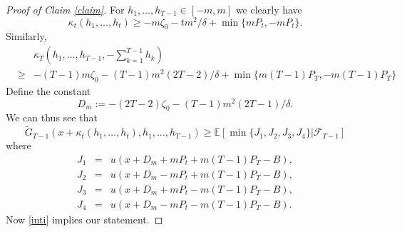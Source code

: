 \documentclass[a4paper]{article}
\begin{document}
\begin{proof}[Proof of Claim \ref{claim}]
For $h_{1},\ldots,h_{T-1}\in [-m,m]$ we clearly have
$$
\kappa_{t}(h_{1},\ldots,h_{t})\geq -m\zeta_{0}-tm^{2}/\delta+\min\{mP_{t},-mP_{t}\}.	
$$
Similarly,
\begin{eqnarray*} & & 
\kappa_{T}\left(h_{1},\ldots,h_{T-1},-\sum_{k=1}^{T-1}h_{k}\right)\\
&\geq& -(T-1)m\zeta_{0}-(T-1)m^{2}(2T-2)/\delta+\min\{m(T-1)P_{T},-m(T-1)P_{T}\}
\end{eqnarray*}
Define the constant
$$
D_{m}:=-(2T-2)\zeta_{0}-(T-1)m^{2}(2T-1)/\delta.
$$
We can thus see that
$$
\tilde{G}_{T-1}(x+\kappa_{t}(h_{1},\ldots,h_{t}),h_{1},\ldots,h_{T-1})\geq \mathbb{E}\left[{}
\min\{J_{1},J_{2},J_{3},J_{4}\}\left\vert\mathcal{F}_{T-1}\right.\right]
$$
where
\begin{eqnarray*}
J_{1} &=& u(x+D_{m}+mP_{t}+m(T-1)P_{T}-B),\\
J_{2} &=& u(x+D_{m}-mP_{t}+m(T-1)P_{T}-B),\\
J_{3} &=& u(x+D_{m}+mP_{t}-m(T-1)P_{T}-B),\\
J_{4} &=& u(x+D_{m}-mP_{t}-m(T-1)P_{T}-B).	
\end{eqnarray*}
Now \eqref{inti} implies our statement.
\end{proof}
\end{document}
